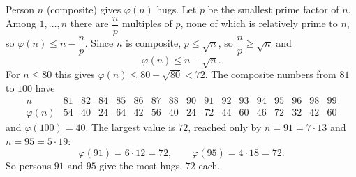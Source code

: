 Person $n$ (composite) gives $\varphi(n)$ hugs. Let $p$ be the smallest prime factor of $n$. Among $1,\dots,n$ there are $\dfrac np$ multiples of $p$, none of which is relatively prime to $n$, so $\varphi(n)\le n-\dfrac np$. Since $n$ is composite, $p\le\sqrt n$, so $\dfrac np\ge\sqrt n$ and
\[\varphi(n)\le n-\sqrt n.\]
For $n\le80$ this gives $\varphi(n)\le80-\sqrt{80}<72$. The composite numbers from $81$ to $100$ have
\[\begin{array}{c|cccccccccccccccc}
n&81&82&84&85&86&87&88&90&91&92&93&94&95&96&98&99\\\hline
\varphi(n)&54&40&24&64&42&56&40&24&72&44&60&46&72&32&42&60
\end{array}\]
and $\varphi(100)=40$. The largest value is $72$, reached only by $n=91=7\cdot13$ and $n=95=5\cdot19$:
\[\varphi(91)=6\cdot12=72,\qquad\varphi(95)=4\cdot18=72.\]
So persons $\boxed{91\text{ and }95}$ give the most hugs, $72$ each.
